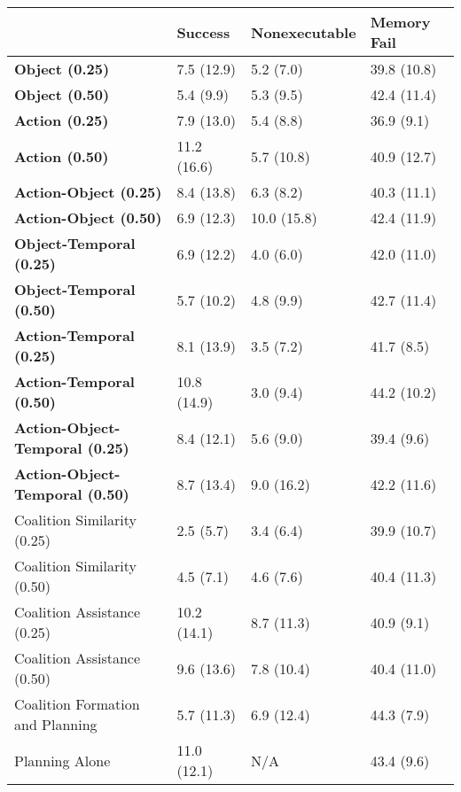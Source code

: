 \begin{tabular}{llll}
\hline
                                        & Success     & Nonexecutable   & Memory Fail   \\
\hline
 \textbf{Object (0.25)}                 & 7.5 (12.9)  & 5.2 (7.0)       & 39.8 (10.8)   \\
 \textbf{Object (0.50)}                 & 5.4 (9.9)   & 5.3 (9.5)       & 42.4 (11.4)   \\
 \textbf{Action (0.25)}                 & 7.9 (13.0)  & 5.4 (8.8)       & 36.9 (9.1)    \\
 \textbf{Action (0.50)}                 & 11.2 (16.6) & 5.7 (10.8)      & 40.9 (12.7)   \\
 \textbf{Action-Object (0.25)}          & 8.4 (13.8)  & 6.3 (8.2)       & 40.3 (11.1)   \\
 \textbf{Action-Object (0.50)}          & 6.9 (12.3)  & 10.0 (15.8)     & 42.4 (11.9)   \\
 \textbf{Object-Temporal (0.25)}        & 6.9 (12.2)  & 4.0 (6.0)       & 42.0 (11.0)   \\
 \textbf{Object-Temporal (0.50)}        & 5.7 (10.2)  & 4.8 (9.9)       & 42.7 (11.4)   \\
 \textbf{Action-Temporal (0.25)}        & 8.1 (13.9)  & 3.5 (7.2)       & 41.7 (8.5)    \\
 \textbf{Action-Temporal (0.50)}        & 10.8 (14.9) & 3.0 (9.4)       & 44.2 (10.2)   \\
 \textbf{Action-Object-Temporal (0.25)} & 8.4 (12.1)  & 5.6 (9.0)       & 39.4 (9.6)    \\
 \textbf{Action-Object-Temporal (0.50)} & 8.7 (13.4)  & 9.0 (16.2)      & 42.2 (11.6)   \\
 Coalition Similarity (0.25)            & 2.5 (5.7)   & 3.4 (6.4)       & 39.9 (10.7)   \\
 Coalition Similarity (0.50)            & 4.5 (7.1)   & 4.6 (7.6)       & 40.4 (11.3)   \\
 Coalition Assistance (0.25)            & 10.2 (14.1) & 8.7 (11.3)      & 40.9 (9.1)    \\
 Coalition Assistance (0.50)            & 9.6 (13.6)  & 7.8 (10.4)      & 40.4 (11.0)   \\
 Coalition Formation and Planning       & 5.7 (11.3)  & 6.9 (12.4)      & 44.3 (7.9)    \\
 Planning Alone                         & 11.0 (12.1) & N/A             & 43.4 (9.6)    \\
\hline
\end{tabular}
